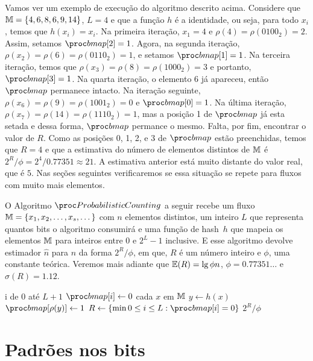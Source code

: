Vamos ver um exemplo de execução do algoritmo descrito acima. Considere que $\mathbb{M} = \{ 4, 6, 8, 6, 9, 14 \}$, $L = 4$ e
que a função $h$ é a identidade, ou seja, para todo $x_i$, temos que $h(x_i) = x_i$. Na primeira iteração, $x_1 = 4$ e 
$\rho(4) = \rho(0100_2) = 2$. Assim, setamos $\bitmap[2] = 1$. Agora, na segunda iteração, 
$\rho(x_2) = \rho(6) = \rho(0110_2) = 1$, e setamos $\bitmap[1] = 1$. Na terceira iteração, temos que 
$\rho(x_3) = \rho(8) = \rho(1000_2) = 3$ e portanto, $\bitmap[3] = 1$. Na quarta iteração, o elemento $6$ já apareceu, 
então $\bitmap$ permanece intacto. Na iteração seguinte, $\rho(x_6) = \rho(9) = \rho(1001_2) = 0$ e $\bitmap[0] = 1$.
Na última iteração, $\rho(x_7) = \rho(14) = \rho(1110_2) = 1$, mas a posição 1 de $\bitmap$ já esta setada e dessa forma,
$\bitmap$ permance o mesmo. Falta, por fim, encontrar o valor de $R$. Como as posições 0, 1, 2, e 3 de $\bitmap$ estão
preenchidas, temos que $R = 4$ e que a estimativa do número de elementos distintos de $\mathbb{M}$ é 
$2^{R}/\phi = 2^4/0.77351 \approx 21$. A estimativa anterior está muito distante do valor real, que é $5$. Nas seções
seguintes verificaremos se essa situação se repete para fluxos com muito mais elementos.

O Algoritmo $\pc$ a seguir recebe um fluxo $\mathbb{M} = \{ x_1, x_2, \dots, x_s, \dots \}$ com $n$ elementos distintos, 
um inteiro $L$ que representa quantos bits o algoritmo consumirá e uma função de hash~$h$ que mapeia os elementos $\mathbb{M}$ 
para inteiros entre $0$ e $2^L - 1$ inclusive. E esse algoritmo devolve estimador $\hat{n}$ para $n$ da forma 
$2^{R}/\phi$, em que, $R$ é um número inteiro e $\phi$, uma constante teórica. Veremos mais adiante que 
$\mathbb{E}(R) = \lg \phi n$, $\phi = 0.77351{\dots}$ e $\sigma(R) = 1.12$.

\begin{codebox}
  \li \For i de $0$ até $L + 1$
      \Do
  \li    $\bitmap[i] \gets 0$
      \End
  \li \For cada $x$ em $\mathbb{M}$                               \label{li:pc:for:start}
      \Do
  \li   $y \gets h(x)$
  \li   $\bitmap[\rho(y)] \gets 1$                          \label{li:pc:for:end}
      \End
  \li $R \gets \{ \min 0 \leq i \leq L: \bitmap[i] = 0 \}$  \label{li:pc:r:def}
  \li\Return $2^R/\phi$
  \End
\end{codebox}

\section{Padrões nos bits}
\label{sec:flajolet-martin:pattern}

